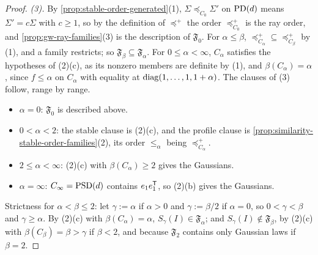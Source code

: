 \begin{proof}
\emph{(3).} By \ref{prop:stable-order-generated}(1), $\Sigma \preceq_{C_0} \Sigma'$ on $\mathrm{PD}(d)$ means $\Sigma' = c\Sigma$
with $c \ge 1$, so by the definition of $\preceq^+$ the order $\preceq^+_{C_0}$ is the ray order, and
\ref{prop:gw-ray-families}(3) is the description of $\mathfrak F_0$. For $\alpha \le \beta$,
$\preceq^+_{C_\alpha} \subseteq \preceq^+_{C_\beta}$ by (1), and a family restricts; so
$\mathfrak F_\beta \subseteq \mathfrak F_\alpha$. For $0 \le \alpha < \infty$, $C_\alpha$ satisfies the
hypotheses of (2)(c), as its nonzero members are definite by (1), and $\beta(C_\alpha) = \alpha$, since
$f \le \alpha$ on $C_\alpha$ with equality at $\operatorname{diag}(1, \dots, 1, 1+\alpha)$. The clauses of (3) follow,
range by range.
\begin{itemize}
\item $\alpha = 0$: $\mathfrak F_0$ is described above.
\item $0 < \alpha < 2$: the stable clause is (2)(c), and the profile clause is
\ref{prop:similarity-stable-order-families}(2), its order $\le_\alpha$ being $\preceq^+_{C_\alpha}$.
\item $2 \le \alpha < \infty$: (2)(c) with $\beta(C_\alpha) \ge 2$ gives the Gaussians.
\item $\alpha = \infty$: $C_\infty = \mathrm{PSD}(d)$ contains $e_1e_1^{\mathsf{T}}$, so (2)(b) gives the Gaussians.
\end{itemize}
Strictness for $\alpha < \beta \le 2$: let $\gamma := \alpha$ if $\alpha > 0$ and $\gamma := \beta/2$ if
$\alpha = 0$, so $0 < \gamma < \beta$ and $\gamma \ge \alpha$. By (2)(c) with $\beta(C_\alpha) = \alpha$,
$S_\gamma(I) \in \mathfrak F_\alpha$; and $S_\gamma(I) \notin \mathfrak F_\beta$, by (2)(c) with $\beta(C_\beta) =
\beta > \gamma$ if $\beta < 2$, and because $\mathfrak F_2$ contains only Gaussian laws if $\beta = 2$.
\end{proof}


